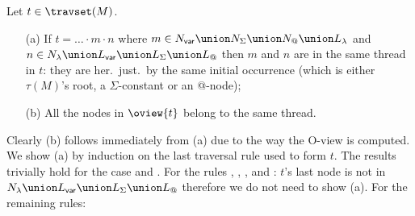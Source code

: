 \begin{lemma}
\label{lem:trav_oview_single_threaded}
Let $t \in \travset(M)$.
\begin{itemize}
\item[(a)] If $t= \ldots \cdot m \cdot n$ where
$m\in N_{\sf var} \union N_\Sigma \union N_@ \union
L_\lambda$ and $n\in N_\lambda \union L_{\sf var}
\union L_\Sigma \union L_@$ then
$m$ and $n$ are in the same thread in $t$: they are her.\ just.\ by the same initial occurrence (which is either $\tau(M)$'s root, a $\Sigma$-constant or an @-node);

\item[(b)] All the nodes in $\oview{t}$ belong to the same thread.
\end{itemize}
\end{lemma}
\proof
Clearly (b) follows immediately from (a) due to the way the O-view is computed. We show (a) by induction on the last traversal rule used to form $t$. The results trivially hold for the case  and . For the rules , , ,
 and : $t$'s last node is not in $N_\lambda\union L_{\sf var} \union L_\Sigma \union L_@$ therefore we do not need to show (a).
For the remaining rules:
